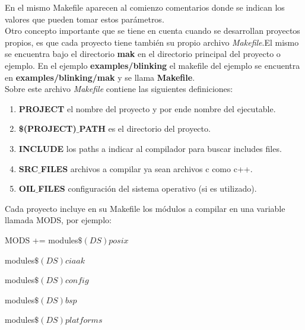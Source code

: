 \documentclass[12pt,letterpaper]{article}
\begin{document}
En el mismo Makefile aparecen al comienzo comentarios donde se indican los valores que pueden tomar estos parámetros.
 \\
 
Otro concepto importante que se tiene en cuenta cuando se desarrollan proyectos propios, es que cada proyecto tiene también su propio archivo \textit{Makefile}.El mismo se encuentra bajo el directorio \textbf{mak} en el directorio principal del proyecto o ejemplo. En el ejemplo \textbf{examples/blinking} el makefile del ejemplo se encuentra en \textbf{examples/blinking/mak} y se llama \textbf{Makefile}.
 \\
 
Sobre este archivo \textit{Makefile} contiene las siguientes definiciones:

\begin{enumerate}
\item \textbf{PROJECT} el nombre del proyecto y por ende nombre del ejecutable.
\item \textbf{\$(PROJECT)$\_$PATH} es el directorio del proyecto.
\item \textbf{INCLUDE} los paths a indicar al compilador para buscar includes files.
\item \textbf{SRC$\_$FILES} archivos a compilar ya sean archivos c como c++.
\item \textbf{OIL$\_$FILES} configuración del sistema operativo (si es utilizado).
\end{enumerate}
Cada proyecto incluye en su Makefile los módulos a compilar en una variable llamada MODS, por ejemplo:

MODS += modules$\$(DS)posix$ \  

        modules$\$(DS)ciaak $\  
        
        modules$\$(DS)config$ \  
        
        modules$\$(DS)bsp $\	
        
        modules$\$(DS)platforms$
 \\
\end{document}
